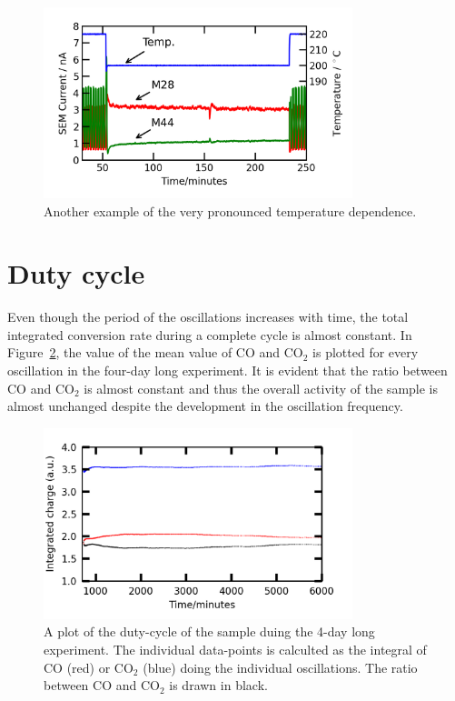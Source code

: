\documentclass[8.5pt,twoside,twocolumn]{article}
\begin{document}
\begin{figure}[h]
\centering
  \includegraphics[width=9cm]{temperature_dependence_supplemental.png}
  \caption{Another example of the very pronounced temperature dependence.}
  \label{fgr:temperature_dependence_supplemental}
\end{figure}

\section{Duty cycle}
Even though the period of the oscillations increases with time, the total integrated conversion rate during a complete cycle is almost constant. In Figure~\ref{fgr:duty_cycles_supplemental}, the value of the mean value of CO and CO$_2$ is plotted for every oscillation in the four-day long experiment. It is evident that the ratio between CO and CO$_2$ is almost constant and thus the overall activity of the sample is almost unchanged despite the development in the oscillation frequency.


\begin{figure}[h]
\centering
  \includegraphics[width=9cm]{duty_cycles_long_measurement_supplemental.png}
  \caption{A plot of the duty-cycle of the sample duing the 4-day long experiment. The individual data-points is calculted as the integral of CO (red) or CO$_2$ (blue) doing the individual oscillations. The ratio between CO and CO$_2$ is drawn in black.}
  \label{fgr:duty_cycles_supplemental}
\end{figure}



\footnotesize{
}
\end{document}
